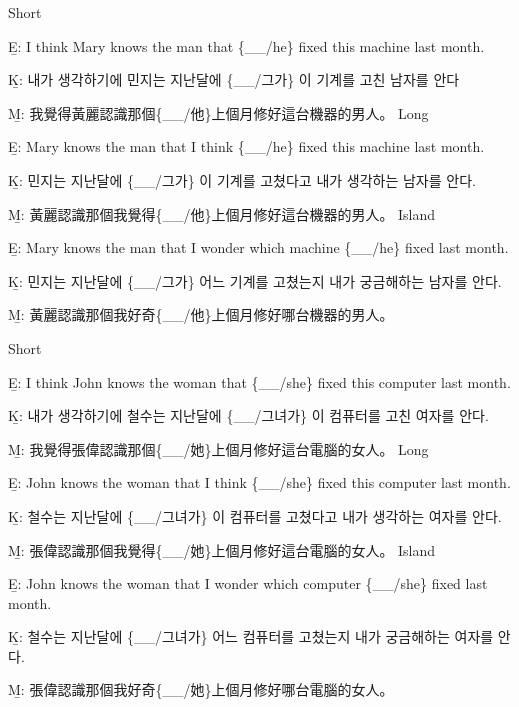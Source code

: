 \pex %
\a Short\par\nobreak
\beginsubsub
\b{E:} I think Mary knows the man that \{\_\_/he\} fixed this machine last month.\par\nobreak
\b{K:} \ko 내가 생각하기에 민지는 지난달에 \{\_\_/그가\} 이 기계를 고친 남자를 안다 \normalfont\par\nobreak
\b{M:} \zh 我覺得黃麗認識那個\{\_\_/他\}上個月修好這台機器的男人。 \normalfont
\endsubsub
\a Long\par\nobreak
\beginsubsub
\b{E:} Mary knows the man that I think \{\_\_/he\} fixed this machine last month.\par\nobreak
\b{K:} \ko 민지는 지난달에 \{\_\_/그가\} 이 기계를 고쳤다고 내가 생각하는 남자를 안다. \normalfont\par\nobreak
\b{M:} \zh 黃麗認識那個我覺得\{\_\_/他\}上個月修好這台機器的男人。 \normalfont
\endsubsub
\a Island\par\nobreak
\beginsubsub
\b{E:} Mary knows the man that I wonder which machine \{\_\_/he\} fixed last month.\par\nobreak
\b{K:} \ko 민지는 지난달에 \{\_\_/그가\} 어느 기계를 고쳤는지 내가 궁금해하는 남자를 안다\normalfont.\par\nobreak
\b{M:} \zh 黃麗認識那個我好奇\{\_\_/他\}上個月修好哪台機器的男人。\normalfont
\endsubsub
\xe

\pex %
\a Short\par\nobreak
\beginsubsub
\b{E:} I think John knows the woman that \{\_\_/she\} fixed this computer last month.\par\nobreak
\b{K:} \ko 내가 생각하기에 철수는 지난달에 \{\_\_/그녀가\} 이 컴퓨터를 고친 여자를 안다. \normalfont\par\nobreak
\b{M:} \zh 我覺得張偉認識那個\{\_\_/她\}上個月修好這台電腦的女人。 \normalfont
\endsubsub
\a Long\par\nobreak
\beginsubsub
\b{E:} John knows the woman that I think \{\_\_/she\} fixed this computer last month.\par\nobreak
\b{K:} \ko 철수는 지난달에 \{\_\_/그녀가\} 이 컴퓨터를 고쳤다고 내가 생각하는 여자를 안다. \normalfont\par\nobreak
\b{M:} \zh 張偉認識那個我覺得\{\_\_/她\}上個月修好這台電腦的女人。 \normalfont
\endsubsub
\a Island\par\nobreak
\beginsubsub
\b{E:} John knows the woman that I wonder which computer \{\_\_/she\} fixed last month.\par\nobreak
\b{K:} \ko 철수는 지난달에 \{\_\_/그녀가\} 어느 컴퓨터를 고쳤는지 내가 궁금해하는 여자를 안다\normalfont.\par\nobreak
\b{M:} \zh 張偉認識那個我好奇\{\_\_/她\}上個月修好哪台電腦的女人。\normalfont
\endsubsub
\xe

